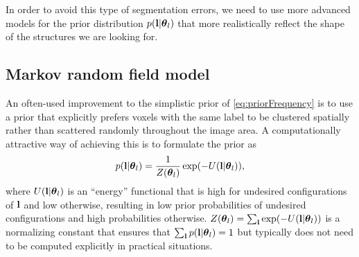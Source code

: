 \documentclass[10pt,twoside]{book}
\begin{document}
In order to avoid this type of segmentation errors, we need to use more advanced models for the prior distribution $p(\mathbf{l} | {\mbox{\boldmath {${\theta}$}}}_l )$ that more realistically reflect the shape of the structures we are looking for. 

\subsection{Markov random field model}

An often-used improvement to the simplistic prior of \eqref{eq:priorFrequency} is to use a prior that explicitly prefers voxels with the same label to be clustered spatially rather than scattered randomly throughout the image area. A computationally attractive way of achieving this is to formulate the prior as
\begin{equation}
  p( \mathbf{l} | {\mbox{\boldmath {${\theta}$}}}_l ) = \frac{1}{Z( {\mbox{\boldmath {${\theta}$}}}_l )} \exp( -U( \mathbf{l} | {\mbox{\boldmath {${\theta}$}}}_l ) ),
  \label{eq:MRFGibbs}
\end{equation}
where $U(\mathbf{l} | {\mbox{\boldmath {${\theta}$}}}_l )$ is an ``energy'' functional that is high for undesired configurations of $\mathbf{l}$ and low otherwise, resulting in low prior probabilities of undesired configurations and high probabilities otherwise. $Z({\mbox{\boldmath {${\theta}$}}}_l) = \sum_{\mathbf{l}} \exp( -U( \mathbf{l} | {\mbox{\boldmath {${\theta}$}}}_l ) )$ is a normalizing constant that ensures that $\sum_{\mathbf{l}} p( \mathbf{l} | {\mbox{\boldmath {${\theta}$}}}_l ) = 1$ but typically does not need to be computed explicitly in practical situations. 
\end{document}

